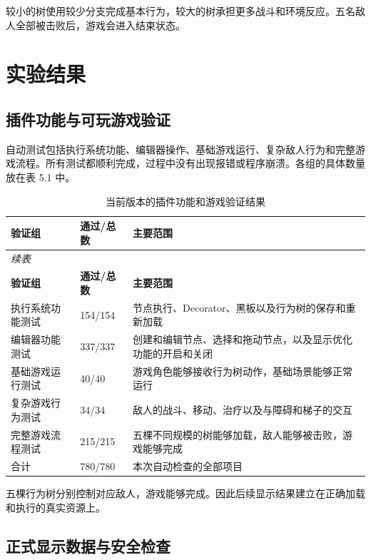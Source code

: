 \documentclass[11pt,a4paper,oneside,extrafontsizes]{memoir}
\begin{document}
较小的树使用较少分支完成基本行为，较大的树承担更多战斗和环境反应。五名敌人全部被击败后，游戏会进入结束状态。

\chapter{实验结果}

\section{插件功能与可玩游戏验证}

自动测试包括执行系统功能、编辑器操作、基础游戏运行、复杂敌人行为和完整游戏流程。所有测试都顺利完成，过程中没有出现报错或程序崩溃。各组的具体数量放在表 5.1 中。

\begin{center}
\small
\begin{longtable}{@{}p{} p{} p{}@{}}
\caption{当前版本的插件功能和游戏验证结果}\label{tab:auto-6}\\
\toprule
\textbf{验证组} & \textbf{通过/总数} & \textbf{主要范围} \\
\midrule
\endfirsthead
\multicolumn{3}{l}{\small\itshape 续表}\\
\toprule
\textbf{验证组} & \textbf{通过/总数} & \textbf{主要范围} \\
\midrule
\endhead
执行系统功能测试 & 154/154 & 节点执行、Decorator、黑板以及行为树的保存和重新加载 \\
编辑器功能测试 & 337/337 & 创建和编辑节点、选择和拖动节点，以及显示优化功能的开启和关闭 \\
基础游戏运行测试 & 40/40 & 游戏角色能够接收行为树动作，基础场景能够正常运行 \\
复杂游戏行为测试 & 34/34 & 敌人的战斗、移动、治疗以及与障碍和梯子的交互 \\
完整游戏流程测试 & 215/215 & 五棵不同规模的树能够加载，敌人能够被击败，游戏能够完成 \\
合计 & 780/780 & 本次自动检查的全部项目 \\
\bottomrule
\end{longtable}
\end{center}

五棵行为树分别控制对应敌人，游戏能够完成。因此后续显示结果建立在正确加载和执行的真实资源上。

\section{正式显示数据与安全检查}
\end{document}
